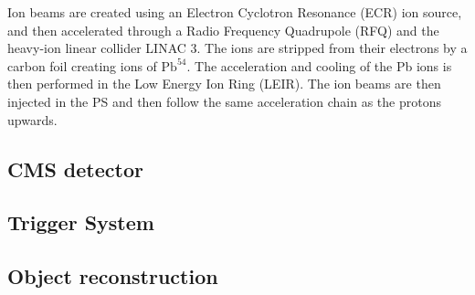 Ion beams are created using an Electron Cyclotron Resonance (ECR) ion source, and then accelerated through a Radio Frequency Quadrupole (RFQ) and the heavy-ion linear collider LINAC 3. The ions are stripped from their electrons by a carbon foil creating ions of $\mathrm{Pb}^{54}$. The acceleration and cooling of the Pb ions is then performed in the Low Energy Ion Ring (LEIR). The ion beams are then injected in the PS and then follow the same acceleration chain as the protons upwards.


\subsection{CMS detector}\label{sec:Introduction_Experiment_CMS}




\subsection{Trigger System}


\subsection{Object reconstruction}



